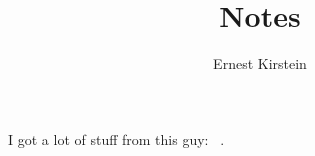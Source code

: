 \documentclass[11pt]{article}
\begin{document}
\title{Notes}
\author{Ernest Kirstein}
\maketitle

I got a lot of stuff from this guy: ~\cite{lewis}.

{}

\end{document}
